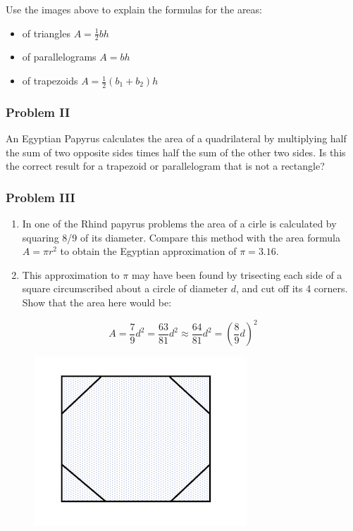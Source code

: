 \documentclass[11pt]{article}
\makeatletter
\def\maxwidth{\ifdim\Gin@nat@width>\linewidth\linewidth
    \else\Gin@nat@width\fi}
\let\Oldincludegraphics\includegraphics
\renewcommand{\includegraphics}[1]{\Oldincludegraphics[width=.8\maxwidth]{#1}}
\providecommand{\tightlist}{%
      \setlength{\itemsep}{0pt}\setlength{\parskip}{0pt}}
\makeatother
\begin{document}
Use the images above to explain the formulas for the areas:

\begin{itemize}
\tightlist
\item
  of triangles \(A = \frac{1}{2}bh\)
\item
  of parallelograms \(A = bh\)
\item
  of trapezoids \(A = \frac{1}{2}(b_1 + b_2)h\)
\end{itemize}

    \subsubsection{Problem II}\label{problem-ii}

An Egyptian Papyrus calculates the area of a quadrilateral by
multiplying half the sum of two opposite sides times half the sum of the
other two sides. Is this the correct result for a trapezoid or
parallelogram that is not a rectangle?

    \subsubsection{Problem III}\label{problem-iii}

\begin{enumerate}
\def\labelenumi{\alph{enumi}.}
\tightlist
\item
  In one of the Rhind papyrus problems the area of a cirle is calculated
  by squaring 8/9 of its diameter. Compare this method with the area
  formula \(A = \pi r^2\) to obtain the Egyptian approximation of
  \(\pi = 3.16\).
\item
  This approximation to \(\pi\) may have been found by trisecting each
  side of a square circumscribed about a circle of diameter \(d\), and
  cut off its 4 corners. Show that the area here would be:
\end{enumerate}

\[ A = \frac{7}{9}d^2 = \frac{63}{81}d^2 \approx \frac{64}{81}d^2 = (\frac{8}{9}d)^2\]

\begin{figure}
\centering
\includegraphics{images/section_I/p2.png}
\caption{}
\end{figure}
\end{document}
